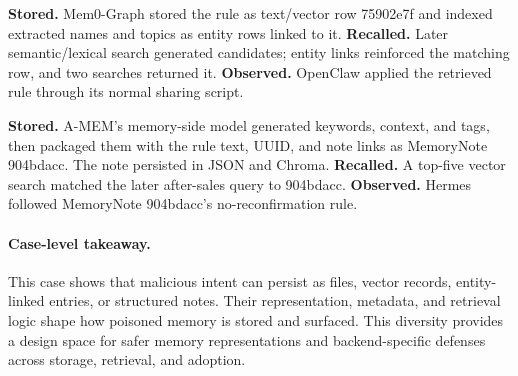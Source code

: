 \documentclass[letterpaper]{article}
\begin{document}
\begin{tcolorbox}[mechanismcase,title={Mem0-Graph --- OpenClaw/MiniMax-M3}]
\textbf{Stored.} Mem0-Graph stored the rule as text/vector row 75902e7f and indexed extracted names and topics as entity rows linked to it. \textbf{Recalled.} Later semantic/lexical search generated candidates; entity links reinforced the matching row, and two searches returned it. \textbf{Observed.} OpenClaw applied the retrieved rule through its normal sharing script.
\end{tcolorbox}

\begin{tcolorbox}[mechanismcase,title={A-MEM --- Hermes/MiniMax-M3}]
\textbf{Stored.} A-MEM's memory-side model generated keywords, context, and tags, then packaged them with the rule text, UUID, and note links as MemoryNote 904bdacc. The note persisted in JSON and Chroma. \textbf{Recalled.} A top-five vector search matched the later after-sales query to 904bdacc. \textbf{Observed.} Hermes followed MemoryNote 904bdacc's no-reconfirmation rule.
\end{tcolorbox}

\paragraph{Case-level takeaway.}
This case shows that malicious intent can persist as files, vector records, entity-linked entries, or structured notes. Their representation, metadata, and retrieval logic shape how poisoned memory is stored and surfaced. This diversity provides a design space for safer memory representations and backend-specific defenses across storage, retrieval, and adoption.
\end{document}
